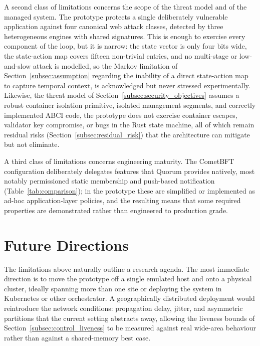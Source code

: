 A second class of limitations concerns the scope of the threat model and of the managed system. The prototype protects a single deliberately vulnerable application against four canonical web attack classes, detected by three heterogeneous engines with shared signatures. This is enough to exercise every component of the loop, but it is narrow: the state vector is only four bits wide, the state-action map covers fifteen non-trivial entries, and no multi-stage or low-and-slow attack is modelled, so the Markov limitation of Section~\ref{subsec:assumption} regarding the inability of a direct state-action map to capture temporal context, is acknowledged but never stressed experimentally. Likewise, the threat model of Section~\ref{subsec:security_objectives} assumes a robust container isolation primitive, isolated management segments, and correctly implemented ABCI code, the prototype does not exercise container escapes, validator key compromise, or bugs in the Rust state machine, all of which remain residual risks (Section~\ref{subsec:residual_risk}) that the architecture can mitigate but not eliminate.

A third class of limitations concerns engineering maturity.  The CometBFT configuration deliberately delegates features that Quorum provides natively, most notably permissioned static membership and push-based notification (Table~\ref{tab:comparison}); in the prototype these are simplified or implemented as ad-hoc application-layer policies, and the resulting means that some required properties are demonstrated rather than engineered to production grade.

\section{Future Directions}
\label{sec:conc_future_work}

The limitations above naturally outline a research agenda. The most immediate direction is to move the prototype off a single emulated host and onto a physical cluster, ideally spanning more than one site or deploying the system in Kubernetes or other orchestrator. A geographically distributed deployment would reintroduce the network conditions: propagation delay, jitter, and asymmetric partitions that the current setting abstracts away, allowing the liveness bounds of Section~\ref{subsec:control_liveness} to be measured against real wide-area behaviour rather than against a shared-memory best case.

